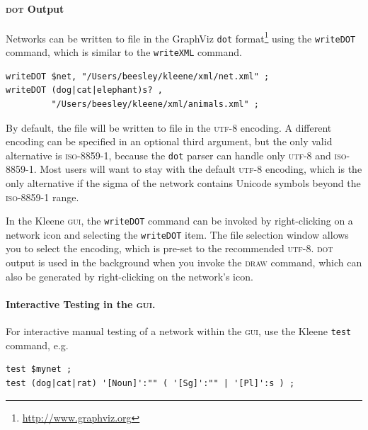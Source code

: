 \documentclass[letterpaper,12pt]{article}
\newcommand{\acro}{\textsc}
\begin{document}
\paragraph{\acro{dot} Output}

Networks can be written to file in the GraphViz \verb!dot!
format\footnote{\url{http://www.graphviz.org}} using the
\texttt{writeDOT} command, which is similar to the \texttt{writeXML} command.

\begin{Verbatim}[fontsize=\small]
writeDOT $net, "/Users/beesley/kleene/xml/net.xml" ;
writeDOT (dog|cat|elephant)s? , 
         "/Users/beesley/kleene/xml/animals.xml" ;
\end{Verbatim}

By default, the file will be written to file in the \acro{utf-8}
encoding.  A different encoding can be specified in an optional third
argument, but the only valid alternative is \acro{iso-8859-1}, because
the \verb!dot! parser can handle only \acro{utf-8} and \acro{iso-8859-1}.
Most users will want to stay with the default \acro{utf-8} encoding,
which is the only alternative if the sigma of the network contains
Unicode symbols beyond the \acro{iso-8859-1} range.

In the Kleene \acro{gui}, the \verb!writeDOT! command can be invoked by
right-clicking on a network icon and selecting the \verb!writeDOT! item.
The file selection window allows you to select the encoding, which is
pre-set to the recommended \acro{utf-8}.  \acro{dot} output is used in the
background when you invoke the \acro{draw} command, which can also be
generated by right-clicking on the network's icon.

\paragraph{Interactive Testing in the \acro{gui}.}

For interactive manual testing of a network within the \acro{gui},
use the Kleene \texttt{test} command, e.g.

\begin{Verbatim}[fontsize=\small]
test $mynet ;
test (dog|cat|rat) '[Noun]':"" ( '[Sg]':"" | '[Pl]':s ) ;
\end{Verbatim}
\end{document}
